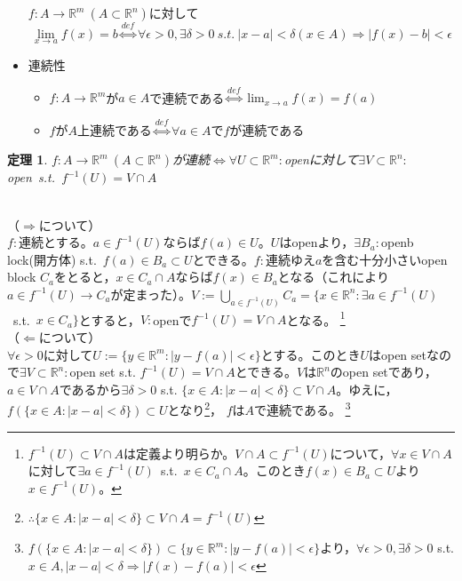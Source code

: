 \documentclass[dvipdfmx,a4j,10pt]{jsarticle}
\makeatletter
\theoremstyle{mystyle1}
\newtheorem{thm}[dfn]{定理}
\theoremstyle{mystyle2}
\renewenvironment{proof}[1][\proofname]{\par
  \pushQED{\qed}%
  \normalfont
  \topsep6\p@\@plus6\p@ \trivlist
  \item[\hskip\labelsep{\bfseries\sffamily #1}]\ignorespaces
}{%
  \popQED\endtrivlist\@endpefalse
}
\renewcommand\proofname{証明}
\makeatother
\begin{document}
\begin{itemize}
    $f:A\to\mathbb{R}^m\ (A\subset\mathbb{R}^n)$に対して
    \[
    \lim_{x\to a}f(x)=b \overset{def}{\Leftrightarrow} \forall\epsilon>0,\exists\delta>0\ s.t.\ |x-a|<\delta(x\in A)\Rightarrow|f(x)-b|<\epsilon
    \]
    \item 連続性
    \begin{itemize}
        \item $f:A\to\mathbb{R}^m$が$a\in A$で連続である$\overset{def}{\Leftrightarrow}$$\displaystyle\lim_{x\to a}f(x)=f(a)$
        \item $f$が$A$上連続である$\overset{def}{\Leftrightarrow}$$\forall a\in A$で$f$が連続である
    \end{itemize}
\end{itemize}

\newpage

\begin{framed}
    \begin{thm}
        $f:A\to\mathbb{R}^m\ (A\subset\mathbb{R}^n)$が連続$\Leftrightarrow$$\forall U\subset \mathbb{R}^m:$openに対して$\exists V\subset\mathbb{R}^n:$open\ s.t.\ $f^{-1}(U)=V\cap A$\footnotemark
    \end{thm}
\end{framed}


\begin{proof}　\\
    （$\Rightarrow$について）\\
    $f:$連続とする。$a\in f^{-1}(U)$ならば$f(a)\in U$。$U$はopenより，$\exists B_a:$openb lock(開方体) s.t.\ $f(a)\in B_a\subset U$とできる。$f:$連続ゆえ$a$を含む十分小さいopen block $C_a$をとると，$x\in C_a\cap A$ならば$f(x)\in B_a$となる（これにより$a\in f^{-1}(U)\to C_a$が定まった）。$\displaystyle V:=\bigcup_{a\in f^{-1}(U)}C_a=\{x\in\mathbb{R}^n:\exists a\in f^{-1}(U)$\ s.t.\ $x\in C_a\}$とすると，$V:$openで$f^{-1}(U)=V\cap A$となる。
    \footnote{
    $f^{-1}(U)\subset V\cap A$は定義より明らか。$V\cap A\subset f^{-1}(U)$について，$\forall x\in V\cap A$に対して$\exists a\in f^{-1}(U)$\ s.t.\ $x\in C_a\cap A$。このとき$f(x)\in B_a\subset U$より$x\in f^{-1}(U)$。
    }
    \\
    （$\Leftarrow$について）\\
    $\forall\epsilon>0$に対して$U:=\{y\in\mathbb{R}^m:|y-f(a)| <\epsilon\}$とする。このとき$U$はopen setなので$\exists V\subset\mathbb{R}^n:$open set s.t. $f^{-1}(U)=V\cap A$とできる。$V$は$\mathbb{R}^n$のopen setであり，$a\in V\cap A$であるから$\exists\delta>0$ s.t. $\{x\in A:|x-a|<\delta\}\subset V\cap A$。ゆえに，$f(\{x\in A:|x-a|<\delta\})\subset U$となり\footnote{
    $\therefore\{x\in A:|x-a|<\delta\}\subset V\cap A=f^{-1}(U)$
    }，
    $f$は$A$で連続である。
    \footnote{
    $f(\{x\in A:|x-a|<\delta\})\subset\{y\in\mathbb{R}^m:|y-f(a)|<\epsilon\}$より，$\forall\epsilon>0,\exists\delta>0$ s.t. $x\in A,|x-a|<\delta\Rightarrow|f(x)-f(a)|<\epsilon$
    }
\end{proof}
\end{document}
